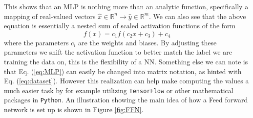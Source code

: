 \documentclass[12pt, a4paper]{book}
\begin{document}
This shows that an MLP is nothing more than an analytic function, specifically a mapping of real-valued vectors $\hat{x}\in\mathbb{R}^n\rightarrow\hat{y}\in\mathbb{R}^m$. We can also see that the above equation is essentially 
a nested sum of scaled activation functions of the form
$$
  f(x)=c_1f(c_2x+c_3)+c_4  
$$
where the parameters $c_i$ are the weights and biases. By adjusting these parameters we shift the activation function to better match the label we are training the data on, this is the flexibility of a NN. 
Something else we can note is that Eq. (\ref{eq:MLP}) can easily be changed into matrix notation, as hinted with Eq. (\ref{eq:dataset}). However this realization can help make computing the values a much easier 
task by for example utilizing \verb|TensorFlow| \cite{TensorFlow} or other mathematical packages in \verb|Python|. An illustration showing the main idea of how a Feed forward network is set up is shown in Figure \ref{fig:FFN}.
\end{document}
